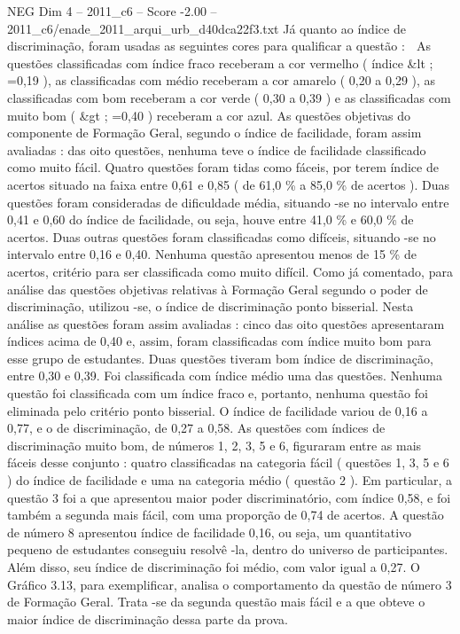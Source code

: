 \begin{textsample}{NEG Dim 4 – 2011\_c6 – Score -2.00 – 2011\_c6/enade\_2011\_arqui\_urb\_d40dca22f3.txt}
Já quanto ao índice de discriminação, foram usadas as seguintes cores para qualificar a questão :  As questões classificadas com índice fraco receberam a cor vermelho ( índice \&lt ; =0,19 ), as classificadas com médio receberam a cor amarelo ( 0,20 a 0,29 ), as classificadas com bom receberam a cor verde ( 0,30 a 0,39 ) e as classificadas com muito bom ( \&gt ; =0,40 ) receberam a cor azul.
As questões objetivas do componente de Formação Geral, segundo o índice de facilidade, foram assim avaliadas : das oito questões, nenhuma teve o índice de facilidade classificado como muito fácil.
Quatro questões foram tidas como fáceis, por terem índice de acertos situado na faixa entre 0,61 e 0,85 ( de 61,0 \% a 85,0 \% de acertos ).
Duas questões foram consideradas de dificuldade média, situando -se no intervalo entre 0,41 e 0,60 do índice de facilidade, ou seja, houve entre 41,0 \% e 60,0 \% de acertos.
Duas outras questões foram classificadas como difíceis, situando -se no intervalo entre 0,16 e 0,40.
Nenhuma questão apresentou menos de 15 \% de acertos, critério para ser classificada como muito difícil.
Como já comentado, para análise das questões objetivas relativas à Formação Geral segundo o poder de discriminação, utilizou -se, o índice de discriminação ponto bisserial.
Nesta análise as questões foram assim avaliadas : cinco das oito questões apresentaram índices acima de 0,40 e, assim, foram classificadas com índice muito bom para esse grupo de estudantes.
Duas questões tiveram bom índice de discriminação, entre 0,30 e 0,39.
Foi classificada com índice médio uma das questões.
Nenhuma questão foi classificada com um índice fraco e, portanto, nenhuma questão foi eliminada pelo critério ponto bisserial.
O índice de facilidade variou de 0,16 a 0,77, e o de discriminação, de 0,27 a 0,58.
As questões com índices de discriminação muito bom, de números 1, 2, 3, 5 e 6, figuraram entre as mais fáceis desse conjunto : quatro classificadas na categoria fácil ( questões 1, 3, 5 e 6 ) do índice de facilidade e uma na categoria médio ( questão 2 ).
Em particular, a questão 3 foi a que apresentou maior poder discriminatório, com índice 0,58, e foi também a segunda mais fácil, com uma proporção de 0,74 de acertos.
A questão de número 8 apresentou índice de facilidade 0,16, ou seja, um quantitativo pequeno de estudantes conseguiu resolvê -la, dentro do universo de participantes.
Além disso, seu índice de discriminação foi médio, com valor igual a 0,27.
O Gráfico 3.13, para exemplificar, analisa o comportamento da questão de número 3 de Formação Geral.
Trata -se da segunda questão mais fácil e a que obteve o maior índice de discriminação dessa parte da prova.

\end{textsample}
